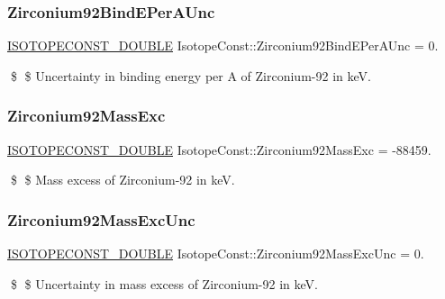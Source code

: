 \subsubsection{\texorpdfstring{Zirconium92\+Bind\+E\+Per\+A\+Unc}{Zirconium92BindEPerAUnc}}
{\footnotesize\ttfamily \mbox{\hyperlink{group___isotope_const-_macros_ga8f45a7272ce02c0b4c65c44636ed719a}{I\+S\+O\+T\+O\+P\+E\+C\+O\+N\+S\+T\+\_\+\+D\+O\+U\+B\+LE}} Isotope\+Const\+::\+Zirconium92\+Bind\+E\+Per\+A\+Unc = 0.}

\$ \$ Uncertainty in binding energy per A of Zirconium-\/92 in keV. \mbox{\label{group___isotope_const-_zirconium-_zr92_ga1e78d18c65d2547733a465be44f79ccd}} 
\subsubsection{\texorpdfstring{Zirconium92\+Mass\+Exc}{Zirconium92MassExc}}
{\footnotesize\ttfamily \mbox{\hyperlink{group___isotope_const-_macros_ga8f45a7272ce02c0b4c65c44636ed719a}{I\+S\+O\+T\+O\+P\+E\+C\+O\+N\+S\+T\+\_\+\+D\+O\+U\+B\+LE}} Isotope\+Const\+::\+Zirconium92\+Mass\+Exc = -\/88459.}

\$ \$ Mass excess of Zirconium-\/92 in keV. \mbox{\label{group___isotope_const-_zirconium-_zr92_gaa5cf93a24a3d9b09da5bbefe5c224b5a}} 
\subsubsection{\texorpdfstring{Zirconium92\+Mass\+Exc\+Unc}{Zirconium92MassExcUnc}}
{\footnotesize\ttfamily \mbox{\hyperlink{group___isotope_const-_macros_ga8f45a7272ce02c0b4c65c44636ed719a}{I\+S\+O\+T\+O\+P\+E\+C\+O\+N\+S\+T\+\_\+\+D\+O\+U\+B\+LE}} Isotope\+Const\+::\+Zirconium92\+Mass\+Exc\+Unc = 0.}

\$ \$ Uncertainty in mass excess of Zirconium-\/92 in keV. \mbox{\label{group___isotope_const-_zirconium-_zr92_gab4bdd106967e2e73c672a59367bf703f}} 
